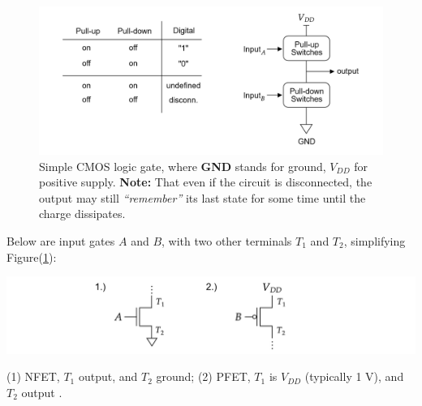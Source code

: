 \vspace{-1em}
\begin{figure}[ht!]
  \centering
  \includegraphics[width=\textwidth]{Sections/circuits/pun_pdn.png}
  \caption{Simple CMOS logic gate, where \textbf{GND} stands for ground, \textbf{$V_{DD}$} for positive supply.
  \textbf{Note:} That even if the circuit is disconnected, the output may still \emph{``remember''} its last state for some 
  time until the charge dissipates.}
  \label{fig:cmos-logic-gate}
\end{figure}

\begin{Def}

  \noindent
  Below are input gates $A$ and $B$, with two other terminals $T_1$ and $T_2$, simplifying Figure(\ref{fig:cmos-logic-gate}):

  \begin{center}
    
    \includegraphics[width=\textwidth]{Sections/circuits/np_simp.png}
  \end{center}
  
  \noindent
  (1) NFET, $T_1$ output, and $T_2$ ground; (2) PFET, $T_1$ is $V_{DD}$ (typically 1 V), and $T_2$ output \cite{youtube:1rZyGL1K5QI}.

\end{Def}

\newpage

